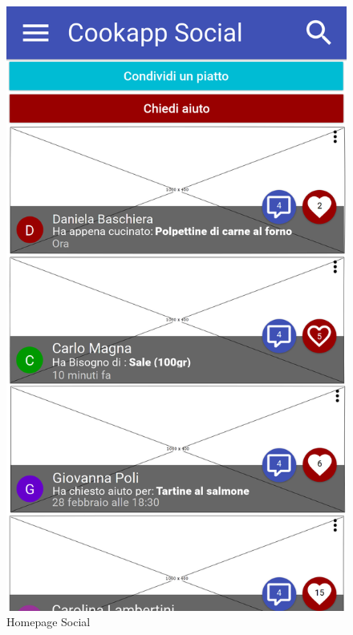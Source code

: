\begin{figure}[H]
	\begin{minipage}{.49\textwidth}
		\includegraphics[width=\textwidth]{img/wireframe/homepage_social.png}
		\caption{Homepage Social}
	\end{minipage}
	\hfill
	\begin{minipage}{.49\textwidth}

\end{minipage}
\end{figure}
